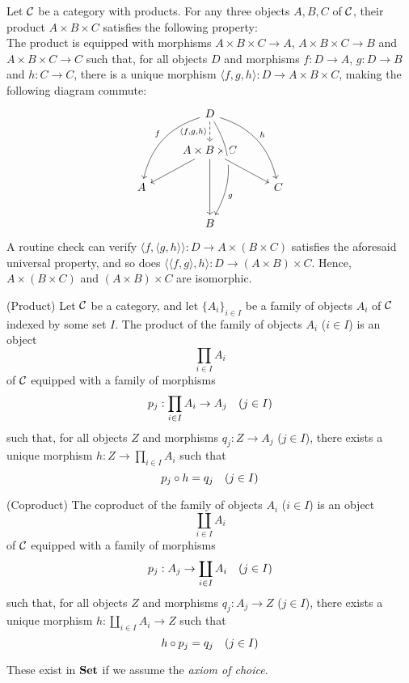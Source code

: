 \begin{xca}
Let $\mathcal{C}$ be a category with products. For any three objects $A, B, C$ of
$\mathcal{C}$, their product $A \times B \times C$ satisfies the following
property:\\
The product is equipped with morphisms $A \times B \times C \to A$, $A \times B
\times C \to B$ and $A \times B \times C \to C$ such that, for all objects $D$
and morphisms $f: D \to A$, $g: D \to B$ and $h: C \to C$, there is a unique
morphism $\langle f, g, h \rangle: D \to A \times B \times C$, making the
following diagram commute:
\[
\begin{tikzcd}
    & D \arrow[ddl, swap, bend right, "f"]
        \arrow[ddd, bend left, crossing over, "g", near end]
        \arrow[ddr, bend left, "h"]
        \arrow[d, swap, dashed, "\langle {f, g, h} \rangle"]
        & \\
    & A \times B \times C \arrow[dl]
                          \arrow[dd]
                          \arrow[dr, crossing over]
                          & \\
    A & & C \\
    & B &
\end{tikzcd}
\]
A routine check can verify $\langle f, \langle g, h \rangle \rangle: D \to
A \times (B \times C)$ satisfies the aforesaid universal property, and so does
$\langle \langle f, g \rangle, h \rangle: D \to (A \times B) \times C$. Hence,
$A \times (B \times C)$ and $(A \times B) \times C$ are isomorphic.
\end{xca}

\begin{xca}
(Product) Let $\mathcal{C}$ be a category, and let $\{ A_i \}_{i \in I}$ be a family
of objects $A_i$ of $\mathcal{C}$ indexed by some set $I$. The product of the
family of objects $A_i$ ($i \in I$) is an object
\[
\prod_{i \in I} A_i
\]
of $\mathcal{C}$ equipped with a family of morphisms
\[
p_j : \prod_{i \in I} A_i \to A_j \quad (j \in I)
\]
such that, for all objects $Z$ and morphisms $q_j : Z \to A_j$ ($j \in I$),
there exists a unique morphism $h: Z \to \prod_{i \in I} A_i$ such that
\[
p_j \circ h = q_j \quad (j \in I)
\]

(Coproduct) The coproduct of the family of objects $A_i$ ($i \in I$) is an
object
\[
\coprod_{i \in I} A_i
\]
of $\mathcal{C}$ equipped with a family of morphisms
\[
p_j : A_j \to \coprod_{i \in I} A_i \quad (j \in I)
\]
such that, for all objects $Z$ and morphisms $q_j : A_j \to Z$ ($j \in I$),
there exists a unique morphism $h: \coprod_{i \in I} A_i \to Z$ such that
\[
h \circ p_j = q_j \quad (j \in I)
\]

These exist in $\mathbf{Set}$ if we assume the \emph{axiom of choice}.
\end{xca}
